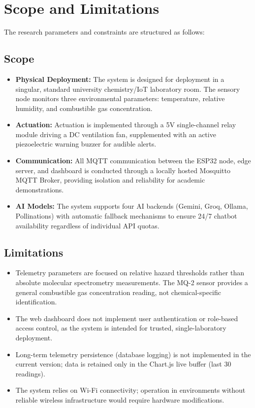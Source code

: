 \documentclass[12pt,a4paper]{report}
\begin{document}
\section{Scope and Limitations}
The research parameters and constraints are structured as follows:

\subsection{Scope}
\begin{itemize}[leftmargin=1.5cm]
    \item \textbf{Physical Deployment:} The system is designed for deployment in a singular, standard university chemistry/IoT laboratory room. The sensory node monitors three environmental parameters: temperature, relative humidity, and combustible gas concentration.
    \item \textbf{Actuation:} Actuation is implemented through a 5V single-channel relay module driving a DC ventilation fan, supplemented with an active piezoelectric warning buzzer for audible alerts.
    \item \textbf{Communication:} All MQTT communication between the ESP32 node, edge server, and dashboard is conducted through a locally hosted Mosquitto MQTT Broker, providing isolation and reliability for academic demonstrations.
    \item \textbf{AI Models:} The system supports four AI backends (Gemini, Groq, Ollama, Pollinations) with automatic fallback mechanisms to ensure 24/7 chatbot availability regardless of individual API quotas.
\end{itemize}

\subsection{Limitations}
\begin{itemize}[leftmargin=1.5cm]
    \item Telemetry parameters are focused on relative hazard thresholds rather than absolute molecular spectrometry measurements. The MQ-2 sensor provides a general combustible gas concentration reading, not chemical-specific identification.
    \item The web dashboard does not implement user authentication or role-based access control, as the system is intended for trusted, single-laboratory deployment.
    \item Long-term telemetry persistence (database logging) is not implemented in the current version; data is retained only in the Chart.js live buffer (last 30 readings).
    \item The system relies on Wi-Fi connectivity; operation in environments without reliable wireless infrastructure would require hardware modifications.
\end{itemize}
\end{document}
